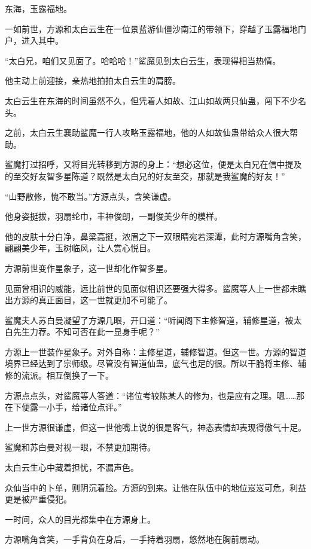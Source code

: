 
\begin{this_body}

东海，玉露福地。

一如前世，方源和太白云生在一位景蓝游仙僵沙南江的带领下，穿越了玉露福地门户，进入其中。

“太白兄，咱们又见面了。哈哈哈！”鲨魔见到太白云生，表现得相当热情。

他主动上前迎接，亲热地拍拍太白云生的肩膀。

太白云生在东海的时间虽然不久，但凭着人如故、江山如故两只仙蛊，闯下不少名头。

之前，太白云生襄助鲨魔一行人攻略玉露福地，他的人如故仙蛊带给众人很大帮助。

鲨魔打过招呼，又将目光转移到方源的身上：“想必这位，便是太白兄在信中提及的至交好友智多星陈道？既然是太白兄的好友至交，那就是我鲨魔的好友！”

“山野散修，愧不敢当。”方源点头，含笑谦虚。

他身姿挺拔，羽扇纶巾，丰神俊朗，一副俊美少年的模样。

他的皮肤十分白净，鼻梁高挺，浓眉之下一双眼睛宛若深潭，此时方源嘴角含笑，翩翩美少年，玉树临风，让人赏心悦目。

方源前世变作星象子，这一世却化作智多星。

见面曾相识的威能，远比前世的见面似相识还要强大得多。鲨魔等人上一世都未瞧出方源的真正面目，这一世就更加不可能了。

鲨魔夫人苏白曼凝望了方源几眼，开口道：“听闻阁下主修智道，辅修星道，被太白先生力荐。不知可否在此一显身手呢？”

方源上一世装作星象子。对外自称：主修星道，辅修智道。但这一世。方源的智道境界已经达到了宗师级。尽管没有智道仙蛊，底气也足的很。所以干脆将主修、辅修的流派。相互倒换了一下。

方源点点头，对鲨魔等人答道：“诸位考较陈某人的修为，也是应有之理。嗯……那在下便露一小手，给诸位点评。”

上一世方源很谦虚，但这一世他嘴上说的很是客气，神态表情却表现得傲气十足。

鲨魔和苏白曼对视一眼，不禁更加期待。

太白云生心中藏着担忧，不漏声色。

众仙当中的卜单，则阴沉着脸。方源的到来。让他在队伍中的地位岌岌可危，利益更是被严重侵犯。

一时间，众人的目光都集中在方源身上。

方源嘴角含笑，一手背负在身后，一手持着羽扇，悠然地在胸前扇动。


\end{this_body}
